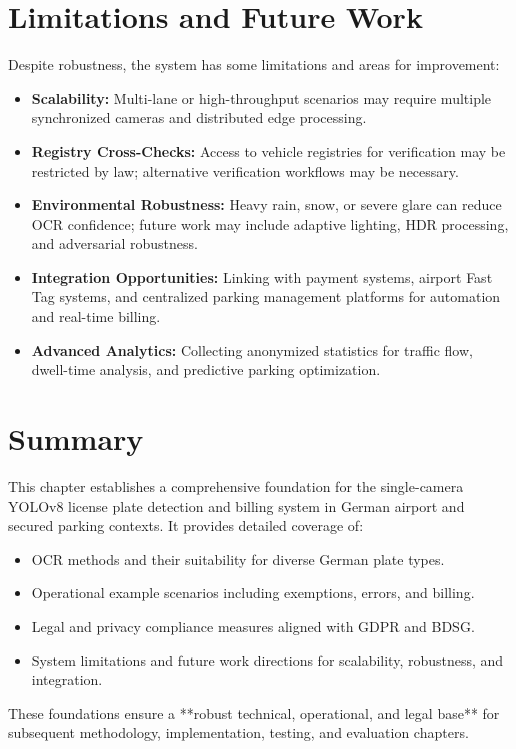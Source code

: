 	\section{Limitations and Future Work}
	Despite robustness, the system has some limitations and areas for improvement:
	
	\begin{itemize}
		\item \textbf{Scalability:} Multi-lane or high-throughput scenarios may require multiple synchronized cameras and distributed edge processing.
		\item \textbf{Registry Cross-Checks:} Access to vehicle registries for verification may be restricted by law; alternative verification workflows may be necessary.
		\item \textbf{Environmental Robustness:} Heavy rain, snow, or severe glare can reduce OCR confidence; future work may include adaptive lighting, HDR processing, and adversarial robustness.
		\item \textbf{Integration Opportunities:} Linking with payment systems, airport Fast Tag systems, and centralized parking management platforms for automation and real-time billing.
		\item \textbf{Advanced Analytics:} Collecting anonymized statistics for traffic flow, dwell-time analysis, and predictive parking optimization.
	\end{itemize}
	
	\section{Summary}
	This chapter establishes a comprehensive foundation for the single-camera YOLOv8 license plate detection and billing system in German airport and secured parking contexts.  
	It provides detailed coverage of:
	
	\begin{itemize}
		\item OCR methods and their suitability for diverse German plate types.
		\item Operational example scenarios including exemptions, errors, and billing.
		\item Legal and privacy compliance measures aligned with GDPR and BDSG.
		\item System limitations and future work directions for scalability, robustness, and integration.
	\end{itemize}
	
	These foundations ensure a **robust technical, operational, and legal base** for subsequent methodology, implementation, testing, and evaluation chapters.
	
	
